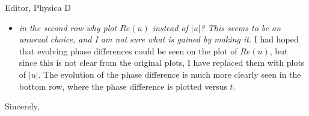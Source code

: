 \documentclass[11pt]{letter}
\begin{document}
\begin{letter}{Editor, Physica D}
\begin{enumerate}[(a)]
\begin{itemize}
\item \emph{in the second row why plot $Re(u)$ instead of $|u|$? This seems to be an unusual choice, and I am not sure what is gained by making it.} I had hoped that evolving phase differences could be seen on the plot of $Re(u)$, but since this is not clear from the original plots, I have replaced them with plots of $|u|$. The evolution of the phase difference is much more clearly seen in the bottom row, where the phase difference is plotted versus $t$.

\end{itemize}

\end{enumerate}

\closing{Sincerely,}

\end{letter}
\end{document}
